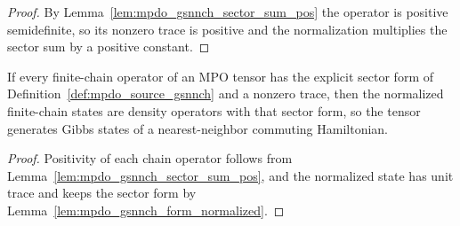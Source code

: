\begin{proof}\leanok
    By Lemma~\ref{lem:mpdo_gsnnch_sector_sum_pos} the operator is positive
    semidefinite, so its nonzero trace is positive and the normalization
    multiplies the sector sum by a positive constant.
\end{proof}

\begin{lemma}
    \label{thm:mpdo_gsnnch_of_sector_form}
    \leanok
    If every finite-chain operator of an MPO tensor has the explicit sector
    form of Definition~\ref{def:mpdo_source_gsnnch} and a nonzero trace, then
    the normalized finite-chain states are density operators with that sector
    form, so the tensor generates Gibbs states of a nearest-neighbor
    commuting Hamiltonian.
\end{lemma}

\begin{proof}\leanok
    Positivity of each chain operator follows from
    Lemma~\ref{lem:mpdo_gsnnch_sector_sum_pos}, and the normalized state has
    unit trace and keeps the sector form by
    Lemma~\ref{lem:mpdo_gsnnch_form_normalized}.
\end{proof}
